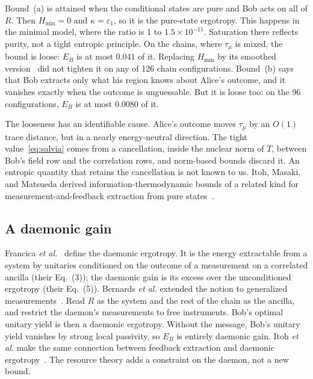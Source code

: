 \documentclass[aps,pra,twocolumn,reprint,superscriptaddress,nofootinbib,floatfix]{revtex4-2}
\theoremstyle{plain}
\theoremstyle{remark}
\newcommand{\Hmin}{H_{\min}}
\begin{document}
Bound~(a) is attained when the conditional states are pure and Bob acts on all of $R$. Then
$\Hmin=0$ and $\kappa=\varepsilon_1$, so it is the pure-state ergotropy. This happens in the
minimal model,
where the ratio is 1 to $1.5\times10^{-11}$. Saturation there reflects purity, not a tight
entropic principle. On the chains, where $\tau_\mu$ is mixed, the bound is loose: $E_B$ is at
most $0.041$ of it. Replacing $\Hmin$ by its smoothed version~\cite{Tomamichel2016} did not
tighten it on any of 126 chain configurations. Bound~(b) says that Bob extracts only what his
region knows about Alice's outcome, and it vanishes exactly when the outcome is unguessable.
But it is loose too: on the 96 configurations, $E_B$ is at most $0.0080$ of it.

The looseness has an identifiable cause. Alice's outcome moves $\tau_\mu$ by an $O(1)$ trace
distance, but in a nearly energy-neutral direction. The tight value~\eqref{eq:salvia} comes
from a cancellation, inside the nuclear norm of $T$, between Bob's field row and the
correlation rows, and norm-based bounds discard it. An entropic quantity that retains the
cancellation is not known to us. Itoh, Masaki, and Matsueda derived information-thermodynamic
bounds of a related kind for measurement-and-feedback extraction from pure
states~\cite{Itoh2026}.

\subsection{A daemonic gain}

Francica \emph{et al.}~\cite{Francica2017} define the daemonic ergotropy. It is the energy
extractable from a system by unitaries conditioned on the outcome of a measurement on a
correlated ancilla (their Eq.~(3)); the daemonic gain is its excess over the unconditioned
ergotropy (their Eq.~(5)). Bernards \emph{et al.} extended the notion to generalized
measurements~\cite{Bernards2019}. Read $R$ as the system and the rest of the chain as the
ancilla, and restrict the daemon's measurements to free instruments. Bob's optimal unitary
yield is then a daemonic ergotropy. Without the message, Bob's unitary yield vanishes by
strong local passivity, so $E_B$ is entirely daemonic gain. Itoh \emph{et al.} make the same
connection between feedback extraction and daemonic ergotropy~\cite{Itoh2026}. The resource
theory adds a constraint on the daemon, not a new bound.

\end{document}
